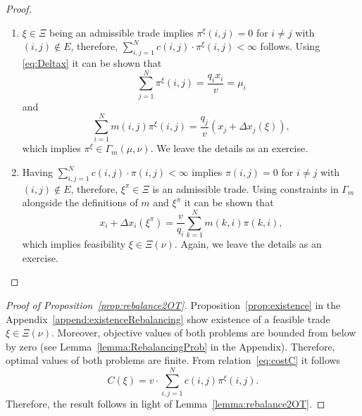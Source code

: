 \documentclass{article}
\theoremstyle{definition}
\begin{document}
\begin{proof}
\begin{enumerate}
\item[a)] $\xi \in \Xi$ being an admissible trade implies $\pi^\xi (i,j) = 0$ for $i \neq j$ with $(i, j) \not\in E$, therefore,  $\sum_{i,j =1}^N c(i,j) \cdot  \pi^\xi(i,j) < \infty$ follows. Using \eqref{eq:Deltax} it can be shown that
\[
\sum_{j=1}^N \pi^\xi (i,j) = \frac{q_i x_i}{v} = \mu_i
\]
and 
\[
\sum\limits_{i=1}^N m(i,j)\pi^\xi (i,j) = \frac{q_j}{v} \left( x_j + \Delta x_j(\xi) \right),
\]
which implies $\pi^\xi \in \Gamma_m (\mu, \nu)$. We leave the details as an exercise. 

\item[b)] Having $\sum_{i,j =1}^N c(i,j) \cdot  \pi(i,j) < \infty$ implies $\pi (i,j) = 0$ for $i \neq j$ with $(i, j) \not\in E$, therefore, $\xi^\pi \in \Xi$ is an admissible trade. Using constraints in $\Gamma_m$ alongside the definitions of $m$ and $\xi^\pi$ it can be shown that
\[
x_i + \Delta x_i (\xi^\pi) = \frac{v}{q_i} \sum_{k=1}^N m(k,i) \pi (k, i),
\]
which implies feasibility $\xi \in \Xi(\nu)$. Again, we leave the details as an exercise. 
\end{enumerate}    
\end{proof}


\begin{proof}[Proof of Proposition~\ref{prop:rebalance2OT}]
Proposition~\ref{prop:existence} in the Appendix~\ref{append:existenceRebalancing} show existence of a feasible trade $\xi \in \Xi (\nu)$. Moreover, objective values of both problems are bounded from below by zero (see Lemma~\ref{lemma:RebalancingProb} in the Appendix). Therefore, optimal values of both problems are finite. From relation~\eqref{eq:costC} it follows
\[
C(\xi) = v \cdot \sum_{i,j = 1}^N c(i,j) \pi^\xi (i,j).
\]
Therefore, the result follows in light of Lemma~\ref{lemma:rebalance2OT}.    
\end{proof}





\end{document}

